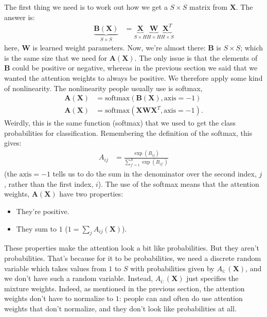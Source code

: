 \documentclass{article}
\newcommand{\bracket}[3]{\left#1 #3 \right#2}
\renewcommand{\b}{\bracket{(}{)}}
\newcommand{\W}{\mathbf{W}}
\newcommand{\A}{\mathbf{A}}
\newcommand{\B}{\mathbf{B}}
\newcommand{\X}{\mathbf{X}}
\begin{document}
The first thing we need is to work out how we get a $S \times S$ matrix from $\X$.  The answer is:
\begin{align}
  \underbrace{\B(\X)}_{S \times S} &= \underbrace{\X}_{S \times H} \underbrace{\W}_{H \times H} \underbrace{\X^T}_{H \times S}
\end{align}
here, $\W$ is learned weight parameters.
Now, we're almost there: $\B$ is $S \times S$; which is the same size that we need for $\A(\X)$.
The only issue is that the elements of $\B$ could be positive or negative, whereas in the previous section we said that we wanted the attention weights to always be positive.
We therefore apply some kind of nonlinearity.
The nonlinearity people usually use is softmax,
\begin{align}
  \A(\X) &= \text{softmax}\b{\B(\X), \text{axis}{=}-1}\\
  \A(\X) &= \text{softmax}\b{\X \W \X^T, \text{axis}{=}-1}.
\end{align}
Weirdly, this is the same function (softmax) that we used to get the class probabilities for classification.
Remembering the definition of the softmax, this gives:
\begin{align}
  A_{ij} &= \frac{\exp\b{B_{ij}}}{\sum_{j'=1}^S \exp\b{B_{ij'}}}
\end{align}
(the $\text{axis}{=}-1$ tells us to do the sum in the denominator over the second index, $j$, rather than the first index, $i$).
The use of the softmax means that the attention weights, $\A(\X)$ have two properties:
\begin{itemize}
  \item They're positive.
  \item They sum to $1$ ($1=\sum_j A_{ij}(\X)$).
\end{itemize}
These properties make the attention look a bit like probabilities.
But they aren't probabilities.
That's because for it to be probabilities, we need a discrete random variable which takes values from $1$ to $S$ with probabilities given by $A_{i:}(\X)$, and we don't have such a random variable.
Instead, $A_{i:}(\X)$ just specifies the mixture weights. 
Indeed, as mentioned in the previous section, the attention weights don't have to normalize to $1$: people can and often do use attention weights that don't normalize, and they don't look like probabilities at all.
\end{document}
